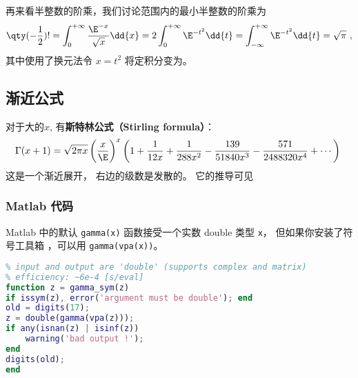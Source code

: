 再来看半整数的阶乘，我们讨论范围内的最小半整数的阶乘为 
\begin{equation}
\qty(-\frac12) ! = \int_0^{+\infty} \frac{\E^{-x}}{\sqrt x}\dd{x} = 2\int_0^{+\infty} \E^{-t^2} \dd{t} = \int_{-\infty}^{+\infty} \E^{-t^2} \dd{t} = \sqrt{\pi}~,
\end{equation}
其中使用了换元法令 $x = t^2$ 将定积分变为。

\subsection{渐近公式}
对于大的$x$, 有\textbf{斯特林公式（Stirling formula）}：
$$
\Gamma(x+1)
  =\sqrt{2\pi x}\left({x\over \E}\right)^x
  \left(
   1
   +{1\over12x}
   +{1\over288x^2}
   -{139\over51840x^3}
   -{571\over2488320x^4}
   + \cdots
  \right)~
$$
这是一个渐近展开， 右边的级数是发散的。 它的推导可见

\subsubsection{Matlab 代码}
Matlab 中的默认 \verb`gamma(x)` 函数接受一个实数 double 类型 \verb`x`， 但如果你安装了符号工具箱 ，可以用 \verb`gamma(vpa(x))`。
\begin{lstlisting}[language=matlab, caption=gamma\_sym.m]
% symbolic implementation of gamma function
% input and output are 'double' (supports complex and matrix)
% efficiency: ~6e-4 [s/eval]
function z = gamma_sym(z)
if issym(z), error('argument must be double'); end
old = digits(17);
z = double(gamma(vpa(z)));
if any(isnan(z) | isinf(z))
    warning('bad output !');
end
digits(old);
end
\end{lstlisting}
